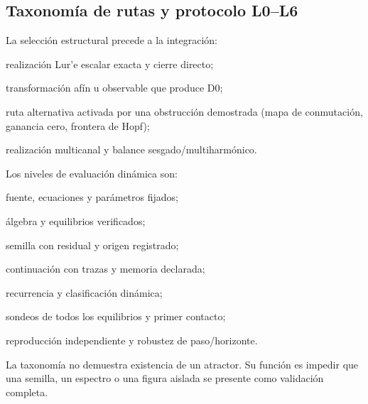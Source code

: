 \subsection{Taxonomía de rutas y protocolo L0--L6}
\label{sec:l0-l6}

La selección estructural precede a la integración:

\begin{description}[style=nextline,leftmargin=2.7em,labelwidth=2.2em]
 \item[D0] realización Lur'e escalar exacta y cierre directo;
 \item[T1] transformación afín u observable que produce D0;
 \item[A1] ruta alternativa activada por una obstrucción demostrada
 (mapa de conmutación, ganancia cero, frontera de Hopf);
 \item[M1] realización multicanal y balance sesgado/multiharmónico.
\end{description}

Los niveles de evaluación dinámica son:
\begin{description}[style=nextline,leftmargin=2.7em,labelwidth=2.2em]
 \item[L0] fuente, ecuaciones y parámetros fijados;
 \item[L1] álgebra y equilibrios verificados;
 \item[L2] semilla con residual y origen registrado;
 \item[L3] continuación con trazas y memoria declarada;
 \item[L4] recurrencia y clasificación dinámica;
 \item[L5] sondeos de todos los equilibrios y primer contacto;
 \item[L6] reproducción independiente y robustez de paso/horizonte.
\end{description}

La taxonomía no demuestra existencia de un atractor. Su función es impedir que
una semilla, un espectro o una figura aislada se presente como validación
completa.

